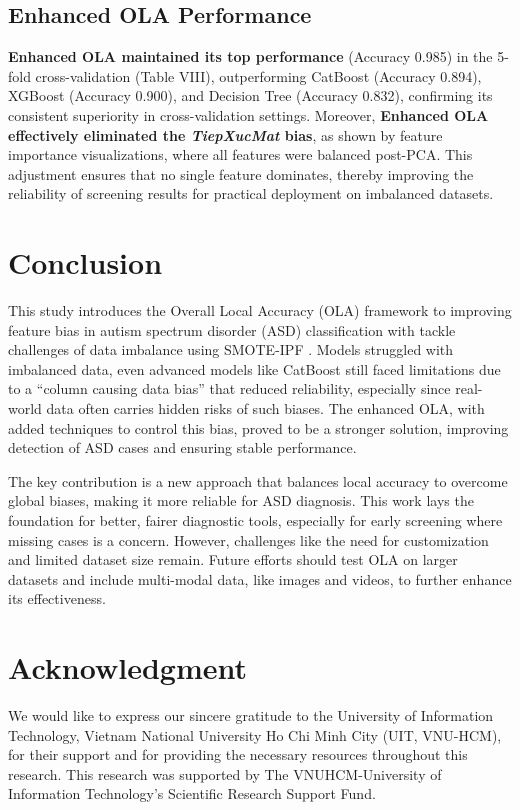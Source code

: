 \documentclass[conference]{IEEEtran}
\begin{document}
\subsection{Enhanced OLA Performance} \textbf{Enhanced OLA maintained its top performance} (Accuracy 0.985) in the 5-fold cross-validation (Table VIII), outperforming CatBoost (Accuracy 0.894), XGBoost (Accuracy 0.900), and Decision Tree (Accuracy 0.832), confirming its consistent superiority in cross-validation settings. Moreover, \textbf{Enhanced OLA effectively eliminated the \textit{TiepXucMat} bias}, as shown by feature importance visualizations, where all features were balanced post-PCA. This adjustment ensures that no single feature dominates, thereby improving the reliability of screening results for practical deployment on imbalanced datasets.

\section{Conclusion}
This study introduces the Overall Local Accuracy (OLA) framework to improving feature bias in autism spectrum disorder (ASD) classification with tackle challenges of data imbalance using SMOTE-IPF . Models struggled with imbalanced data, even advanced models like CatBoost still faced limitations due to a ``column causing data bias'' that reduced reliability, especially since real-world data often carries hidden risks of such biases. The enhanced OLA, with added techniques to control this bias, proved to be a stronger solution, improving detection of ASD cases and ensuring stable performance.

The key contribution is a new approach that balances local accuracy to overcome global biases, making it more reliable for ASD diagnosis. This work lays the foundation for better, fairer diagnostic tools, especially for early screening where missing cases is a concern. However, challenges like the need for customization and limited dataset size remain. Future efforts should test OLA on larger datasets and include multi-modal data, like images and videos, to further enhance its effectiveness.

\section{Acknowledgment}
We would like to express our sincere gratitude to the University of Information Technology, Vietnam National University Ho Chi Minh City (UIT, VNU-HCM), for their support and for providing the necessary resources throughout this research. This research was supported by The VNUHCM-University of Information Technology’s Scientific Research Support Fund.\\
\end{document}
